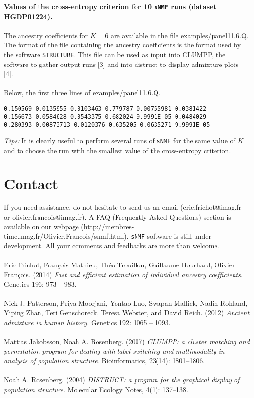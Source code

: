 \documentclass[10pt,a4paper]{article}
\begin{document}
  {\bf Values of the cross-entropy criterion for 10 {\tt sNMF} runs (dataset HGDP01224).} 
\\
\\

\noindent
The ancestry coefficients for $K=6$ are available in the file examples/panel11.6.Q. The format of the file containing the ancestry coefficients is the format used by the software {\tt STRUCTURE}. This file can be used as input into CLUMPP, the software to gather output runs [3] and into distruct to display admixture plots [4].\\
\\
\noindent
Below, the first three lines of examples/panel11.6.Q.
\begin{center}
\footnotesize
\begin{Verbatim}[frame=single]
0.150569 0.0135955 0.0103463 0.779787 0.00755981 0.0381422
0.156673 0.0584628 0.0543375 0.682024 9.9991E-05 0.0484029
0.280393 0.00873713 0.0120376 0.635205 0.0635271 9.9991E-05
\end{Verbatim}
\end{center}
{\it Tips:} It is clearly useful to perform several runs of {\tt sNMF} for the same value of $K$ and to choose the run with the smallest value of the cross-entropy criterion.



\section{Contact}
If you need assistance, do not hesitate to send us an email (eric.frichot@imag.fr or olivier.francois@imag.fr). 
A FAQ (Frequently Asked Questions) section is available 
on our webpage (http://membres-timc.imag.fr/Olivier.Francois/snmf.html). 
{\tt sNMF} software is still under development. All your comments and feedbacks are more than welcome.\\
\\
\noindent
[1] Eric Frichot, François Mathieu, Théo Trouillon, Guillaume Bouchard, Olivier François. (2014) {\it Fast and efficient estimation of individual ancestry coefficients}. Genetics 196: 973 -- 983.\\ 
\\
\noindent
[2]  Nick J. Patterson, Priya Moorjani, Yontao Luo, Swapan Mallick, Nadin Rohland, Yiping Zhan, Teri
Genschoreck, Teresa Webster, and David Reich. (2012) {\it Ancient admixture in human history}. Genetics
192: 1065 -- 1093.\\
\\
\noindent
[3] Mattias Jakobsson, Noah A. Rosenberg. (2007) {\it CLUMPP: a cluster matching and permutation program for dealing with label switching and multimodality in analysis of population structure}. Bioinformatics, 23(14): 1801--1806.
\\
\\
\noindent
[4] Noah A. Rosenberg. (2004) {\it DISTRUCT: a program for the graphical display of population structure}. Molecular Ecology Notes, 4(1): 137--138.




\end{document}
